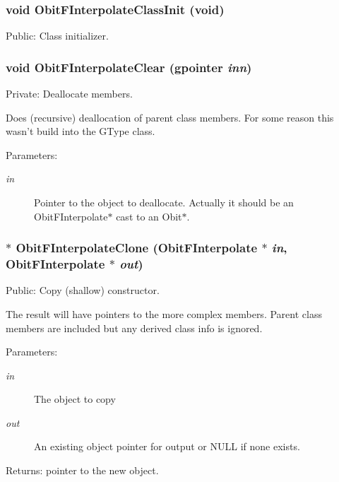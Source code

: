 \subsubsection{\setlength{\rightskip}{0pt plus 5cm}void Obit\-FInterpolate\-Class\-Init (void)}\label{ObitFInterpolate_8c_a17}


Public: Class initializer. 

\subsubsection{\setlength{\rightskip}{0pt plus 5cm}void Obit\-FInterpolate\-Clear (gpointer {\em inn})}\label{ObitFInterpolate_8c_a4}


Private: Deallocate members. 

Does (recursive) deallocation of parent class members. For some reason this wasn't build into the GType class. \begin{Desc}
\item[Parameters:]
\begin{description}
\item[{\em in}]Pointer to the object to deallocate. Actually it should be an Obit\-FInterpolate$\ast$ cast to an Obit$\ast$. \end{description}
\end{Desc}
\subsubsection{$\ast$ Obit\-FInterpolate\-Clone ({\bf Obit\-FInterpolate} $\ast$ {\em in}, {\bf Obit\-FInterpolate} $\ast$ {\em out})}\label{ObitFInterpolate_8c_a11}


Public: Copy (shallow) constructor. 

The result will have pointers to the more complex members. Parent class members are included but any derived class info is ignored. \begin{Desc}
\item[Parameters:]
\begin{description}
\item[{\em in}]The object to copy \item[{\em out}]An existing object pointer for output or NULL if none exists. \end{description}
\end{Desc}
\begin{Desc}
\item[Returns:]pointer to the new object. \end{Desc}
